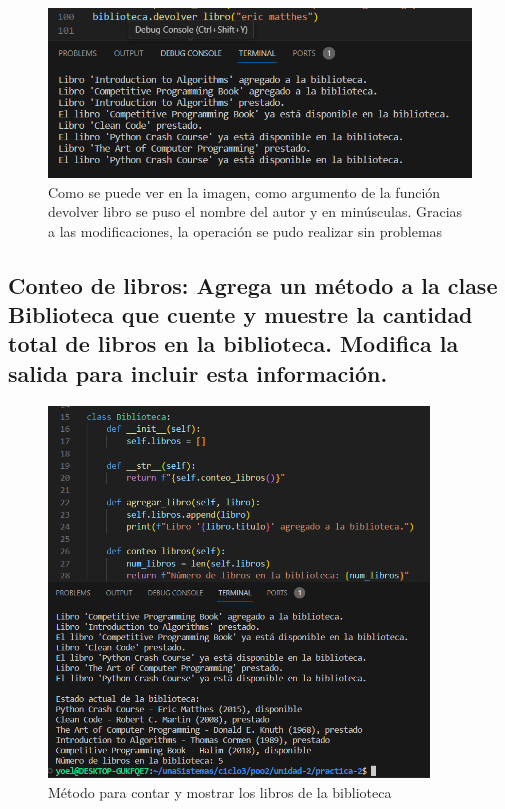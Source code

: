 \documentclass[11pt,a4paper]{article}
\begin{document}
\begin{figure}[H]
    \centering
    \includegraphics{images/3-eje2-4.png}
    \caption{Como se puede ver en la imagen, como argumento de la función devolver libro se puso el nombre del autor y en minúsculas. Gracias a las modificaciones, la operación se pudo realizar sin problemas}
    \label{fig:enter-label}
\end{figure}

\subsection{Conteo de libros:
Agrega un método a la clase Biblioteca que cuente y muestre la cantidad total de libros en la biblioteca.
Modifica la salida para incluir esta información.}

\begin{figure}[H]
    \centering
    \includegraphics[width=0.9\textwidth]{images/4-ej3.png}
    \caption {Método para contar y mostrar los libros de la biblioteca}
    \label{fig:enter-label}
\end{figure}
\end{document}
